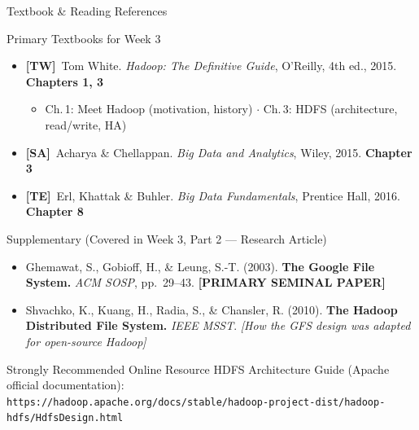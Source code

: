 \documentclass[aspectratio=169,10pt]{beamer}
\begin{document}
\begin{frame}{Textbook \& Reading References}
  \begin{block}{Primary Textbooks for Week 3}
    \begin{itemize}
      \item \textbf{[TW]}\ Tom White. \textit{Hadoop: The Definitive Guide}, O'Reilly, 4th ed., 2015.
            \hfill \textbf{Chapters 1, 3}
            \begin{itemize}
              \small\item Ch.\,1: Meet Hadoop (motivation, history) $\cdot$ Ch.\,3: HDFS (architecture, read/write, HA)
            \end{itemize}
      \item \textbf{[SA]}\ Acharya \& Chellappan. \textit{Big Data and Analytics}, Wiley, 2015.
            \hfill \textbf{Chapter 3}
      \item \textbf{[TE]}\ Erl, Khattak \& Buhler. \textit{Big Data Fundamentals}, Prentice Hall, 2016.
            \hfill \textbf{Chapter 8}
    \end{itemize}
  \end{block}
  \vspace{6pt}
  \begin{exampleblock}{Supplementary (Covered in Week 3, Part 2 — Research Article)}
    \begin{itemize}
      \small
      \item Ghemawat, S., Gobioff, H., \& Leung, S.-T. (2003). \textbf{The Google File System.}
            \textit{ACM SOSP}, pp.\ 29--43. \textbf{[PRIMARY SEMINAL PAPER]}
      \item Shvachko, K., Kuang, H., Radia, S., \& Chansler, R. (2010). \textbf{The Hadoop Distributed File System.}
            \textit{IEEE MSST}. \textit{[How the GFS design was adapted for open-source Hadoop]}
    \end{itemize}
  \end{exampleblock}
  \vspace{4pt}
  \begin{alertblock}{Strongly Recommended Online Resource}
    \small HDFS Architecture Guide (Apache official documentation):\\
    \texttt{https://hadoop.apache.org/docs/stable/hadoop-project-dist/hadoop-hdfs/HdfsDesign.html}
  \end{alertblock}
\end{frame}
\end{document}
